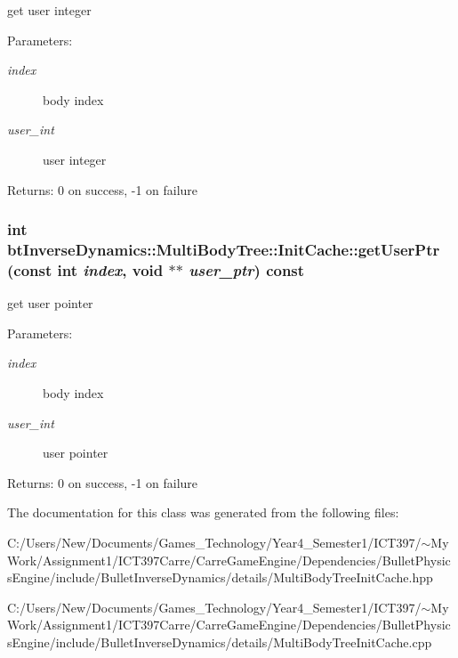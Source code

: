 get user integer \begin{Desc}
\item[Parameters:]
\begin{description}
\item[{\em index}]body index \item[{\em user\_\-int}]user integer \end{description}
\end{Desc}
\begin{Desc}
\item[Returns:]0 on success, -1 on failure \end{Desc}
\hypertarget{classbt_inverse_dynamics_1_1_multi_body_tree_1_1_init_cache_d5bbbbb03bdeeca34fe740f45c86274b}{
\subsubsection[getUserPtr]{\setlength{\rightskip}{0pt plus 5cm}int btInverseDynamics::MultiBodyTree::InitCache::getUserPtr (const int {\em index}, \/  void $\ast$$\ast$ {\em user\_\-ptr}) const}}
\label{classbt_inverse_dynamics_1_1_multi_body_tree_1_1_init_cache_d5bbbbb03bdeeca34fe740f45c86274b}


get user pointer \begin{Desc}
\item[Parameters:]
\begin{description}
\item[{\em index}]body index \item[{\em user\_\-int}]user pointer \end{description}
\end{Desc}
\begin{Desc}
\item[Returns:]0 on success, -1 on failure \end{Desc}


The documentation for this class was generated from the following files:\begin{CompactItemize}
\item 
C:/Users/New/Documents/Games\_\-Technology/Year4\_\-Semester1/ICT397/$\sim$My Work/Assignment1/ICT397Carre/CarreGameEngine/Dependencies/BulletPhysicsEngine/include/BulletInverseDynamics/details/MultiBodyTreeInitCache.hpp\item 
C:/Users/New/Documents/Games\_\-Technology/Year4\_\-Semester1/ICT397/$\sim$My Work/Assignment1/ICT397Carre/CarreGameEngine/Dependencies/BulletPhysicsEngine/include/BulletInverseDynamics/details/MultiBodyTreeInitCache.cpp\end{CompactItemize}
